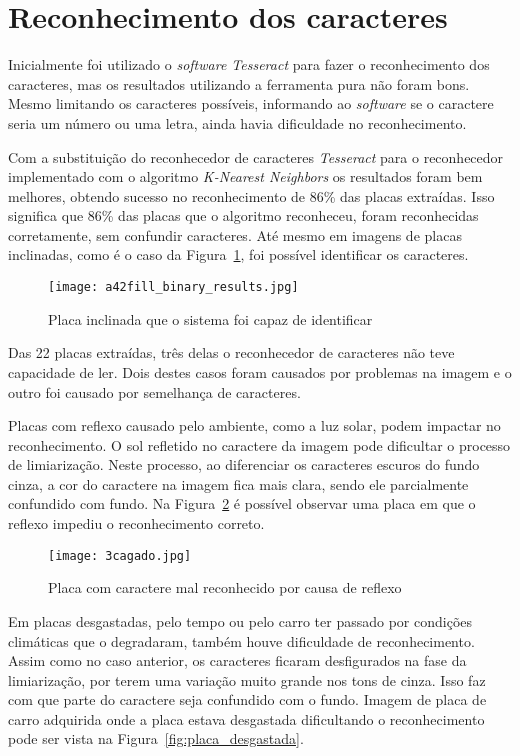 \section{Reconhecimento dos caracteres}
\label{sec:reconhecimento_dos_caracteres_resultados}

Inicialmente foi utilizado o \emph{software Tesseract} para fazer o
reconhecimento dos caracteres, mas os resultados utilizando a ferramenta pura
não foram bons. Mesmo limitando os caracteres possíveis, informando ao
\emph{software} se o caractere seria um número ou uma letra, ainda havia
dificuldade no reconhecimento.

Com a substituição do reconhecedor de caracteres \emph{Tesseract} para o reconhecedor
implementado com o algoritmo \emph{K-Nearest Neighbors} os resultados foram bem
melhores, obtendo sucesso no reconhecimento de 86\% das placas extraídas. Isso
significa que 86\% das placas que o algoritmo reconheceu, foram reconhecidas 
corretamente, sem confundir caracteres. Até
mesmo em imagens de placas inclinadas, como é o caso da
Figura~\ref{fig:plate_torta_result}, foi possível identificar os caracteres.

\begin{figure}[H]
	\centering
	\texttt{[image: a42fill\_binary\_results.jpg]}
	\caption{Placa inclinada que o sistema foi capaz de identificar}
	\label{fig:plate_torta_result}
\end{figure}

Das 22 placas extraídas, três delas o reconhecedor de caracteres não teve
capacidade de ler. Dois destes casos foram causados por problemas na imagem e o outro
foi causado por semelhança de caracteres.

Placas com reflexo causado pelo ambiente, como a luz solar, podem impactar no
reconhecimento. O sol refletido no caractere da imagem pode dificultar o
processo de limiarização. Neste processo, ao diferenciar os caracteres escuros
do fundo cinza, a cor do caractere na imagem fica mais clara, sendo ele
parcialmente confundido com fundo. Na Figura~\ref{fig:cagado_reflexo} é possível
observar uma placa em que o reflexo impediu o reconhecimento correto.

\begin{figure}[H]
	\centering
	\texttt{[image: 3cagado.jpg]}
	\caption{Placa com caractere mal reconhecido por causa de reflexo}
	\label{fig:cagado_reflexo}
\end{figure}

Em placas desgastadas, pelo tempo ou pelo carro ter passado por condições
climáticas que o degradaram, também houve dificuldade de reconhecimento. Assim
como no caso anterior, os caracteres ficaram desfigurados na fase da
limiarização, por terem uma variação muito grande nos tons de cinza. Isso faz
com que parte do caractere seja confundido com o fundo. Imagem de placa de carro
adquirida onde a placa estava desgastada dificultando o reconhecimento pode ser
vista na Figura~\ref{fig:placa_desgastada}.

